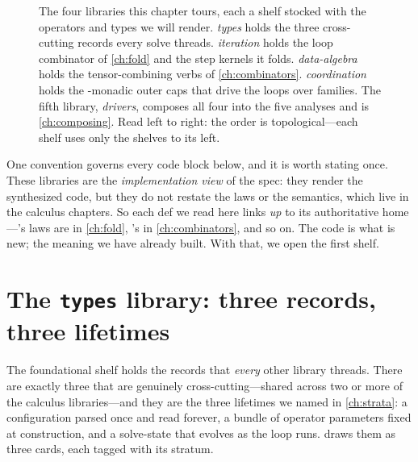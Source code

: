 \begin{figure}[t]
{%
}
\caption[The four libraries side by side]{The four libraries this chapter tours,
each a shelf stocked with the operators and types we will render. \emph{types}
holds the three cross-cutting records every solve threads. \emph{iteration} holds
the loop combinator of \cref{ch:fold} and the step kernels it folds.
\emph{data-algebra} holds the tensor-combining verbs of \cref{ch:combinators}.
\emph{coordination} holds the -monadic outer caps that drive the
loops over families. The fifth library, \emph{drivers}, composes all four into the
five analyses and is \cref{ch:composing}. Read left to right: the order is
topological---each shelf uses only the shelves to its left.}
\label{fig:shelves}
\end{figure}

One convention governs every code block below, and it is worth stating once. These
libraries are the \emph{implementation view} of the spec: they render the
synthesized code, but they do not restate the laws or the semantics, which live in
the calculus chapters. So each def we read here links \emph{up} to its authoritative
home---'s laws are in \cref{ch:fold}, 's
in \cref{ch:combinators}, and so on. The code is what is new; the meaning we have
already built. With that, we open the first shelf.

\section{The \texttt{types} library: three records, three lifetimes}
\label{sec:types}

The foundational shelf holds the records that \emph{every} other library threads.
There are exactly three that are genuinely cross-cutting---shared across two or
more of the calculus libraries---and they are the three lifetimes we named in
\cref{ch:strata}: a configuration parsed once and read forever, a bundle of
operator parameters fixed at construction, and a solve-state that evolves as the
loop runs.  draws them as three cards, each tagged with its
stratum.

